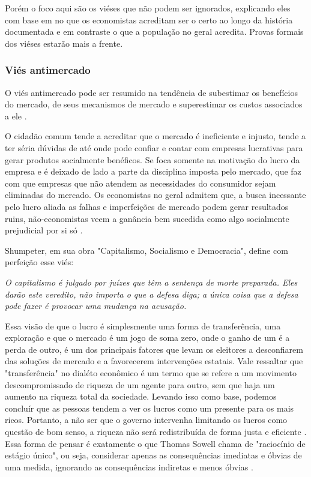 Porém o foco aqui são os viéses que não podem ser ignorados, explicando eles com base em no que os economistas acreditam ser o certo ao longo da história documentada e em contraste o que a população no geral acredita. Provas formais dos viéses estarão mais a frente.


\subsubsection{Viés antimercado}

O viés antimercado pode ser resumido na tendência de subestimar os benefícios do mercado, de seus mecanismos de mercado e superestimar os custos associados a ele \cite{sowell2000basic,sowell2004applied,The_Myth_of_the_Rational_Voter}. 

O cidadão comum tende a acreditar que o mercado é ineficiente e injusto, tende a ter séria dúvidas de até onde pode confiar e contar com empresas lucrativas para gerar produtos socialmente benéficos. Se foca somente na motivação do lucro da empresa e é deixado de lado a parte da disciplina imposta pelo mercado, que faz com que empresas que não atendem as necessidades do consumidor sejam eliminadas do mercado. Os economistas no geral admitem que, a busca incessante pelo lucro aliada as falhas e imperfeições de mercado podem gerar resultados ruins, não-economistas veem a ganância bem sucedida como algo socialmente prejudicial por si só \cite{The_Myth_of_the_Rational_Voter}.

Shumpeter, em sua obra "Capitalismo, Socialismo e Democracia", define com perfeição esse viés:

\begin{citacao}
    \textit{O capitalismo é julgado por juízes que têm a sentença de morte preparada. Eles darão este veredito, não importa o que a defesa diga; a única coisa que a defesa pode fazer é provocar uma mudança na acusação. \newline
    }  \cite{schumpeter1976capitalism}
\end{citacao}

Essa visão de que o lucro é simplesmente uma forma de transferência, uma exploração e que o mercado é um jogo de soma zero, onde o ganho de um é a perda de outro, é um dos principais fatores que levam os eleitores a desconfiarem das soluções de mercado e a favorecerem intervenções estatais. Vale ressaltar que "transferência" no dialéto econômico é um termo que se refere a um movimento descompromissado de riqueza de um agente para outro, sem que haja um aumento na riqueza total da sociedade. Levando isso como base, podemos concluír que as pessoas tendem a ver os lucros como um presente para os mais ricos. Portanto, a não ser que o governo intervenha limitando os lucros como questão de bom senso, a riqueza não será redistribuída de forma justa e eficiente \cite{The_Myth_of_the_Rational_Voter}. Essa forma de pensar é exatamente o que Thomas Sowell chama de "raciocínio de estágio único", ou seja, considerar apenas as consequências imediatas e óbvias de uma medida, ignorando as consequências indiretas e menos óbvias \cite{sowell2004applied}.

